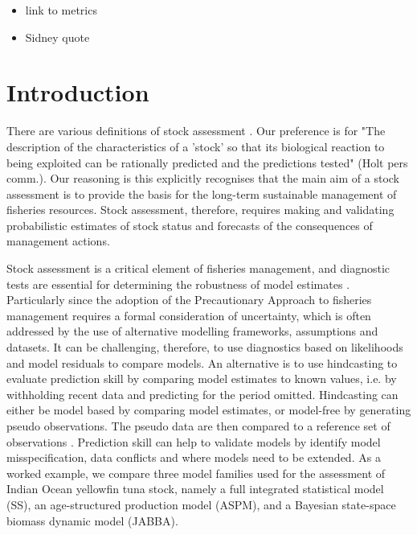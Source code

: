 \documentclass[12pt,halfline,a4paper,nonumbib]{ouparticle}
\begin{document}
\date{\today}


\maketitle



\begin{itemize}
\item link to metrics
\item Sidney quote
\end{itemize}

\section{Introduction}

There are various definitions of stock assessment \parencite[e.g.][]{hilborn2003state,cadrin2014stock}. Our preference is for "The description of the characteristics of a 'stock' so that its biological reaction to being exploited can be rationally predicted and the predictions tested" (Holt pers comm.). Our reasoning is this explicitly recognises that the main aim of a stock assessment is to provide the basis for the long-term sustainable management of fisheries resources. Stock assessment, therefore, requires making and validating probabilistic estimates of stock status and forecasts of the consequences of management actions.

Stock assessment is a critical element of fisheries management, and diagnostic tests are essential for determining the robustness of model estimates \parencite{carvalho2020cookbook}. Particularly since the adoption of the Precautionary Approach to fisheries management \parencite[PA,][]{garcia1996precautionary} requires a formal consideration of uncertainty, which is often addressed by the use of alternative modelling frameworks, assumptions and datasets. It can be challenging, therefore, to use diagnostics based on likelihoods and model residuals to compare models. An alternative is to use hindcasting to evaluate prediction skill \parencite{huschke1959glossary} by comparing model estimates to known values, i.e. by withholding recent data and predicting for the period omitted. Hindcasting can either be model based by comparing model estimates, or model-free by generating pseudo observations. The pseudo data are then compared to a reference set of observations \parencite{jin2008current, weigel2008can, balmaseda1995decadal}. Prediction skill can help to validate models by identify model misspecification, data conflicts and where models need to be extended. As a worked example, we compare three model families used for the assessment of Indian Ocean yellowfin tuna stock, namely a full integrated statistical model (SS), an age-structured production model (ASPM), and a Bayesian state-space biomass dynamic model (JABBA). 
\end{document}
